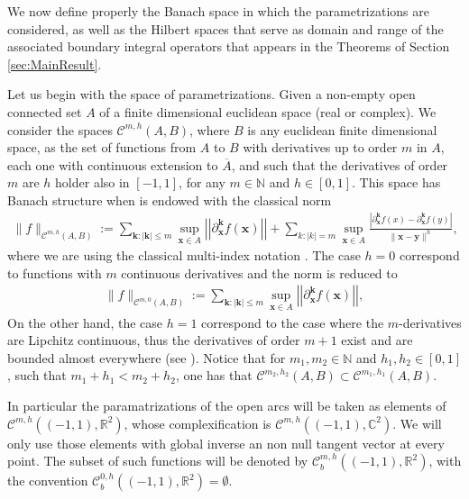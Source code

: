 \documentclass{article}
\newcommand{\IC}{{\mathbb C}}
\newcommand{\IN}{{\mathbb N}}
\newcommand{\IR}{{\mathbb R}}
\newcommand{\cmspaceh}[4]{\mathcal{C}^{#1,#2} \left( #3, #4 \right)}
\newcommand{\rgeoh}[2]{\mathcal{C}_b^{#1,#2}\left( (-1,1), \IR^2 \right)}
\newcommand{\bk}{\bm{k}}
\newcommand{\bx}{\bm{x}}
\newcommand{\by}{\bm{y}}
\begin{document}
We now define properly the Banach space in which the parametrizations are considered, as well as the Hilbert spaces that serve as domain and range of the associated boundary integral operators that appears in the Theorems of Section \ref{sec:MainResult}.

Let us begin with the space of parametrizations. Given a non-empty open connected set $A$ of a finite dimensional euclidean space (real or complex). We consider the spaces $\cmspaceh{m}{h}{A}{B}$, where $B$ is any euclidean finite dimensional space, as the set of functions from $A$ to $B$ with derivatives up to order $m$ in $A$, each one with continuous extension to $\overline{A}$, and such that the derivatives of order $m$ are $h$ holder   also in $[-1,1]$, for any $m\in \IN$ and $h \in [0,1]$. This space has Banach structure when is endowed with the classical norm 
\begin{align*}
\| f \|_{\cmspaceh{m}{h}{A}{B}} := \sum_{\bk: |\bk| \leq m } \sup_{\bx \in A}  \left\vert\left\vert\partial_{\bx}^{\bk} f(\bx) \right\vert\right\vert+ \sum_{k: |k| =m} \sup_{\bx \in A}  \frac{|\partial_{\bx}^{\bk}f(x)-\partial_{\bx}^{\bk}f(y)|}{\| \bx - \by\|^h},
\end{align*}
where we are using the classical multi-index notation \cite[pg. 61]{mclean2000strongly}.  The case $h=0$ correspond to functions with $m$ continuous derivatives and the norm is reduced to 
\begin{align*}
\| f \|_{\cmspaceh{m}{0}{A}{B}} := \sum_{\bk: |\bk| \leq m } \sup_{\bx \in A}  \left\vert\left\vert\partial_{\bx}^{\bk} f(\bx) \right\vert\right\vert,
\end{align*}
On the other hand, the case $h=1$ correspond to the case where the $m$-derivatives are Lipchitz continuous, thus the derivatives of order $m+1$ exist and are bounded almost everywhere (see \cite[pg. 280]{evans1998partial}). Notice that for $m_1, m_2 \in \IN$ and $h_1, h_2 \in [0,1]$, such that $m_1 + h_1 < m_2 + h_2$, one has that $\cmspaceh{m_2}{h_2}{A}{B} \subset \cmspaceh{m_1}{h_1}{A}{B}$.

In particular the paramatrizations of the open arcs will be taken as elements of $\cmspaceh{m}{h}{(-1,1)}{\IR^2}$, whose complexification is $\cmspaceh{m}{h}{(-1,1)}{\IC^2}$. We will only use those elements with global inverse an non null tangent vector at every point. The subset of such functions will be denoted by $\rgeoh{m}{h}$, with the convention $\rgeoh{0}{h}  = \emptyset$.
\end{document}
